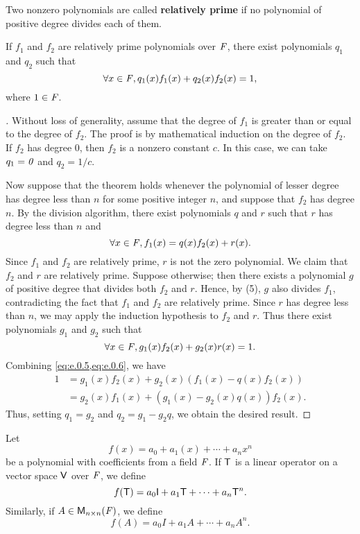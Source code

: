 \begin{defn}\label{e.0.6}
  Two nonzero polynomials are called \textbf{relatively prime} if no polynomial of positive degree divides each of them.
\end{defn}

\begin{thm}\label{e.2}
  If \(f_1\) and \(f_2\) are relatively prime polynomials over \(\mathit{F}\), there exist polynomials \(q_1\) and \(q_2\) such that
  \[
    \forall x \in \mathit{F}, q_1(x) f_1(x) + q_2(x) f_2(x) = 1,
  \]
  where \(1 \in \mathit{F}\).
\end{thm}

\begin{proof}[]
  Without loss of generality, assume that the degree of \(f_1\) is greater than or equal to the degree of \(f_2\).
  The proof is by mathematical induction on the degree of \(f_2\).
  If \(f_2\) has degree \(0\), then \(f_2\) is a nonzero constant \(c\).
  In this case, we can take \(q_1 = \mathit{0}\) and \(q_2 = 1 / c\).

  Now suppose that the theorem holds whenever the polynomial of lesser degree has degree less than \(n\) for some positive integer \(n\), and suppose that \(f_2\) has degree \(n\).
  By the division algorithm, there exist polynomials \(q\) and \(r\) such that \(r\) has degree less than \(n\) and
  \begin{equation}\label{eq:e.0.5}
    \forall x \in \mathit{F}, f_1(x) = q(x) f_2(x) + r(x).
  \end{equation}
  Since \(f_1\) and \(f_2\) are relatively prime, \(r\) is not the zero polynomial.
  We claim that \(f_2\) and \(r\) are relatively prime.
  Suppose otherwise;
  then there exists a polynomial \(g\) of positive degree that divides both \(f_2\) and \(r\).
  Hence, by (5), \(g\) also divides \(f_1\), contradicting the fact that \(f_1\) and \(f_2\) are relatively prime.
  Since \(r\) has degree less than \(n\), we may apply the induction hypothesis to \(f_2\) and \(r\).
  Thus there exist polynomials \(g_1\) and \(g_2\) such that
  \begin{equation}\label{eq:e.0.6}
    \forall x \in \mathit{F}, g_1(x) f_2(x) + g_2(x) r(x) = 1.
  \end{equation}
  Combining \cref{eq:e.0.5,eq:e.0.6}, we have
  \begin{align*}
    1 & = g_1(x) f_2(x) + g_2(x) (f_1(x) - q(x) f_2(x))  \\
      & = g_2(x) f_1(x) + (g_1(x) - g_2(x) q(x)) f_2(x).
  \end{align*}
  Thus, setting \(q_1 = g_2\) and \(q_2 = g_1 - g_2 q\), we obtain the desired result.
\end{proof}

\begin{defn}\label{e.0.7}
  Let
  \[
    f(x) = a_0 + a_1(x) + \cdots + a_n x^n
  \]
  be a polynomial with coefficients from a field \(\mathit{F}\).
  If \(\mathsf{T}\) is a linear operator on a vector space \(\mathsf{V}\) over \(\mathit{F}\), we define
  \[
    f(\T) = a_0 \IT + a_1 \T + \cdots + a_n \T^n.
  \]
  Similarly, if \(A \in \mathsf{M}_{{n} \times n}({\mathit{F}})\), we define
  \[
    f(A) = a_0 I + a_1 A + \cdots + a_n A^n.
  \]
\end{defn}
